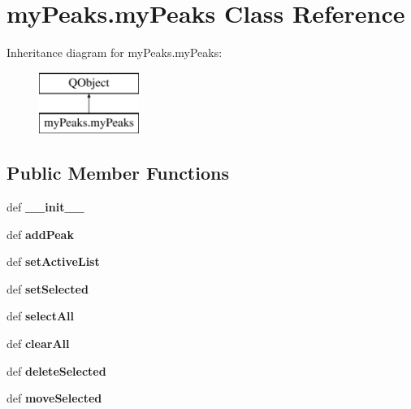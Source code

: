 \hypertarget{classmyPeaks_1_1myPeaks}{\section{my\-Peaks.\-my\-Peaks Class Reference}
\label{classmyPeaks_1_1myPeaks}
}
Inheritance diagram for my\-Peaks.\-my\-Peaks\-:\begin{figure}[H]
\begin{center}
\leavevmode
\includegraphics[height=2.000000cm]{classmyPeaks_1_1myPeaks}
\end{center}
\end{figure}
\subsection*{Public Member Functions}
\begin{DoxyCompactItemize}
\item 
\hypertarget{classmyPeaks_1_1myPeaks_a96aa94100a2cae09e55aec9b21b5c934}{def {\bfseries \-\_\-\-\_\-init\-\_\-\-\_\-}}\label{classmyPeaks_1_1myPeaks_a96aa94100a2cae09e55aec9b21b5c934}

\item 
\hypertarget{classmyPeaks_1_1myPeaks_a85b8109b49ce283142c01c4f386657f5}{def {\bfseries add\-Peak}}\label{classmyPeaks_1_1myPeaks_a85b8109b49ce283142c01c4f386657f5}

\item 
\hypertarget{classmyPeaks_1_1myPeaks_a7f167f9ae163b0025f45f3552d238b4b}{def {\bfseries set\-Active\-List}}\label{classmyPeaks_1_1myPeaks_a7f167f9ae163b0025f45f3552d238b4b}

\item 
\hypertarget{classmyPeaks_1_1myPeaks_a8a2447225e6a87f1b0273697e633ba93}{def {\bfseries set\-Selected}}\label{classmyPeaks_1_1myPeaks_a8a2447225e6a87f1b0273697e633ba93}

\item 
\hypertarget{classmyPeaks_1_1myPeaks_ab4288640f1dd2ea00b5aaa48d11014c4}{def {\bfseries select\-All}}\label{classmyPeaks_1_1myPeaks_ab4288640f1dd2ea00b5aaa48d11014c4}

\item 
\hypertarget{classmyPeaks_1_1myPeaks_aecd844074c5479e3379981ad71b85981}{def {\bfseries clear\-All}}\label{classmyPeaks_1_1myPeaks_aecd844074c5479e3379981ad71b85981}

\item 
\hypertarget{classmyPeaks_1_1myPeaks_a0da9e1901691583a56fb3784eedc91f7}{def {\bfseries delete\-Selected}}\label{classmyPeaks_1_1myPeaks_a0da9e1901691583a56fb3784eedc91f7}

\item 
\hypertarget{classmyPeaks_1_1myPeaks_a90a5f3241c94520978668e1a3f62774e}{def {\bfseries move\-Selected}}\label{classmyPeaks_1_1myPeaks_a90a5f3241c94520978668e1a3f62774e}

\end{DoxyCompactItemize}
